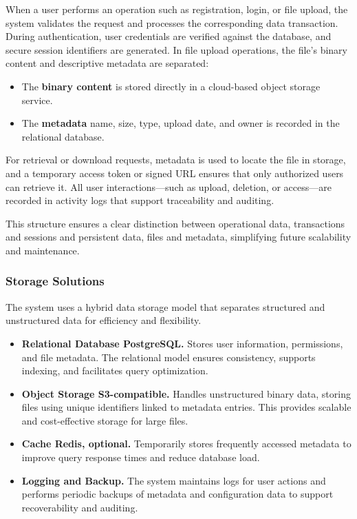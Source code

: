 When a user performs an operation such as registration, login, or file upload, the system validates the request and processes the corresponding data transaction. 
During authentication, user credentials are verified against the database, and secure session identifiers are generated.  
In file upload operations, the file’s binary content and descriptive metadata are separated:  
\begin{itemize}
    \item The \textbf{binary content} is stored directly in a cloud-based object storage service.
    \item The \textbf{metadata} name, size, type, upload date, and owner is recorded in the relational database.
\end{itemize}

For retrieval or download requests, metadata is used to locate the file in storage, and a temporary access token or signed URL ensures that only authorized users can retrieve it.  
All user interactions—such as upload, deletion, or access—are recorded in activity logs that support traceability and auditing.  

This structure ensures a clear distinction between operational data, transactions and sessions and persistent data, files and metadata, simplifying future scalability and maintenance.

\subsubsection{Storage Solutions}

The system uses a hybrid data storage model that separates structured and unstructured data for efficiency and flexibility.

\begin{itemize}
    \item \textbf{Relational Database PostgreSQL.}  
    Stores user information, permissions, and file metadata. The relational model ensures consistency, supports indexing, and facilitates query optimization.

    \item \textbf{Object Storage S3-compatible.}  
    Handles unstructured binary data, storing files using unique identifiers linked to metadata entries. This provides scalable and cost-effective storage for large files.

    \item \textbf{Cache Redis, optional.}  
    Temporarily stores frequently accessed metadata to improve query response times and reduce database load.

    \item \textbf{Logging and Backup.}  
    The system maintains logs for user actions and performs periodic backups of metadata and configuration data to support recoverability and auditing.
\end{itemize}

